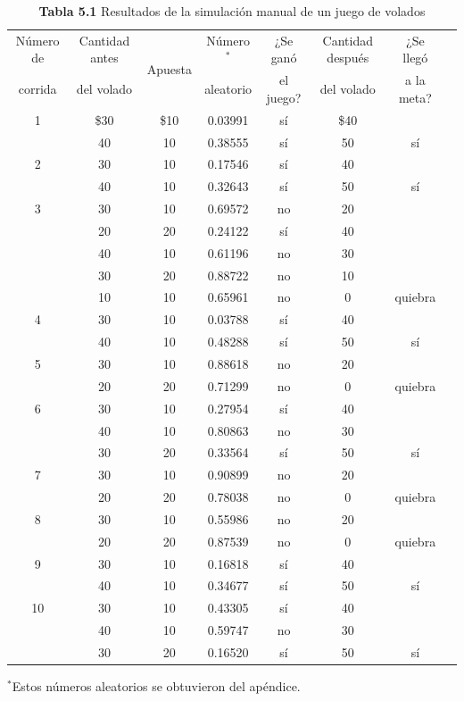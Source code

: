 \documentclass[11pt,letterpaper]{report}
\begin{document}
\begin{table}[H]
\centering
\caption*{\textbf{Tabla 5.1} Resultados de la simulación manual de un juego de volados}
\begin{tabular}{cccccccc}
\toprule
Número de & Cantidad antes & \multirow{2}{*}{Apuesta} & Número$^{*}$ & ¿Se ganó & Cantidad después & ¿Se llegó \\
corrida & del volado & & aleatorio & el juego? & del volado & a la meta? \\
\midrule
1  & \$30 & \$10 & 0.03991 & sí  & \$40 &      \\
   & 40   & 10   & 0.38555 & sí  & 50   & sí   \\[3pt]
2  & 30   & 10   & 0.17546 & sí  & 40   &      \\
   & 40   & 10   & 0.32643 & sí  & 50   & sí   \\[3pt]
3  & 30   & 10   & 0.69572 & no  & 20   &      \\
   & 20   & 20   & 0.24122 & sí  & 40   &      \\
   & 40   & 10   & 0.61196 & no  & 30   &      \\
   & 30   & 20   & 0.88722 & no  & 10   &      \\
   & 10   & 10   & 0.65961 & no  & 0    & quiebra \\[3pt]
4  & 30   & 10   & 0.03788 & sí  & 40   &      \\
   & 40   & 10   & 0.48288 & sí  & 50   & sí   \\[3pt]
5  & 30   & 10   & 0.88618 & no  & 20   &      \\
   & 20   & 20   & 0.71299 & no  & 0    & quiebra \\[3pt]
6  & 30   & 10   & 0.27954 & sí  & 40   &      \\
   & 40   & 10   & 0.80863 & no  & 30   &      \\
   & 30   & 20   & 0.33564 & sí  & 50   & sí   \\[3pt]
7  & 30   & 10   & 0.90899 & no  & 20   &      \\
   & 20   & 20   & 0.78038 & no  & 0    & quiebra \\[3pt]
8  & 30   & 10   & 0.55986 & no  & 20   &      \\
   & 20   & 20   & 0.87539 & no  & 0    & quiebra \\[3pt]
9  & 30   & 10   & 0.16818 & sí  & 40   &      \\
   & 40   & 10   & 0.34677 & sí  & 50   & sí   \\[3pt]
10 & 30   & 10   & 0.43305 & sí  & 40   &      \\
   & 40   & 10   & 0.59747 & no  & 30   &      \\
   & 30   & 20   & 0.16520 & sí  & 50   & sí   \\
\bottomrule
\end{tabular}

\vspace{2pt}
{\footnotesize $^{*}$Estos números aleatorios se obtuvieron del apéndice.}
\end{table}
\end{document}
